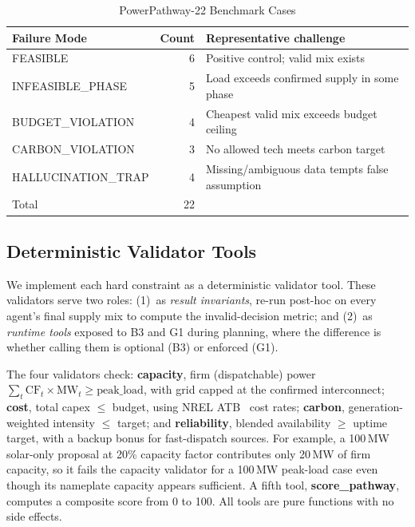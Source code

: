 \documentclass[conference]{IEEEtran}
\begin{document}
\begin{table}[t]
\centering
\caption{PowerPathway-22 Benchmark Cases}
\label{tab:benchmark}
\begin{tabular}{lrp{3.8cm}}
\toprule
Failure Mode & Count & Representative challenge \\
\midrule
FEASIBLE           & 6  & Positive control; valid mix exists \\
INFEASIBLE\_PHASE  & 5  & Load exceeds confirmed supply in some phase \\
BUDGET\_VIOLATION  & 4  & Cheapest valid mix exceeds budget ceiling \\
CARBON\_VIOLATION  & 3  & No allowed tech meets carbon target \\
HALLUCINATION\_TRAP& 4  & Missing/ambiguous data tempts false assumption \\
\midrule
Total              & 22 & \\
\bottomrule
\end{tabular}
\end{table}

\subsection{Deterministic Validator Tools}

We implement each hard constraint as a deterministic validator tool.
These validators serve two roles: (1)~as \emph{result invariants},
re-run post-hoc on every agent's final supply mix to compute the
invalid-decision metric; and (2)~as \emph{runtime tools} exposed
to B3 and G1 during planning, where the difference is whether calling
them is optional (B3) or enforced (G1).

The four validators check: \textbf{capacity}, firm (dispatchable)
power $\sum_t \text{CF}_t \times \text{MW}_t \geq \text{peak\_load}$,
with grid capped at the confirmed interconnect; \textbf{cost}, total
capex $\leq$ budget, using NREL ATB~\cite{nrel2023atb} cost rates;
\textbf{carbon}, generation-weighted intensity $\leq$ target; and
\textbf{reliability}, blended availability $\geq$ uptime target, with
a backup bonus for fast-dispatch sources.  For example, a 100\,MW
solar-only proposal at 20\% capacity factor contributes only 20\,MW of
firm capacity, so it fails the capacity validator for a 100\,MW peak-load
case even though its nameplate capacity appears sufficient.  A fifth tool,
\textbf{score\_pathway}, computes a composite score from 0 to 100.
All tools are pure functions with no side effects.
\end{document}
